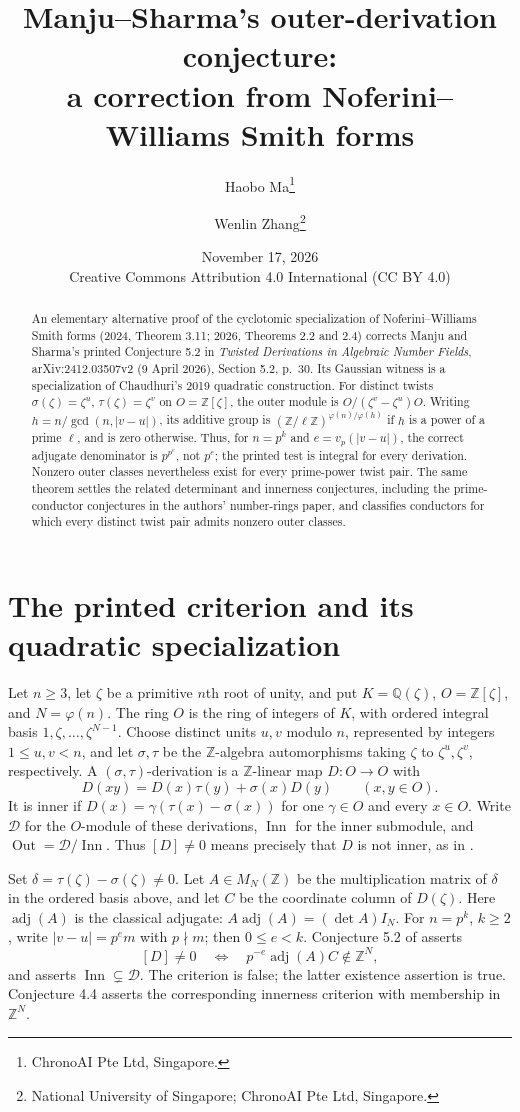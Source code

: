 \documentclass[11pt]{article}
\title{Manju--Sharma's outer-derivation conjecture:\\
a correction from Noferini--Williams Smith forms}
\author{Haobo Ma\thanks{ChronoAI Pte Ltd, Singapore.}
\and Wenlin Zhang\thanks{National University of Singapore; ChronoAI Pte Ltd, Singapore.}}
\date{November 17, 2026\\[3pt]
\small Creative Commons Attribution 4.0 International (CC BY 4.0)}
\newcommand{\ZZ}{\mathbb Z}
\newcommand{\QQ}{\mathbb Q}
\newcommand{\Der}{\mathcal D}
\newcommand{\Inn}{\operatorname{Inn}}
\newcommand{\Out}{\operatorname{Out}}
\newcommand{\adj}{\operatorname{adj}}
\begin{document}
\maketitle
\begin{abstract}
An elementary alternative proof of the cyclotomic specialization of
Noferini--Williams Smith forms (2024, Theorem 3.11; 2026, Theorems 2.2
and 2.4) \cite{NW24,NW26} corrects Manju and Sharma's printed
Conjecture 5.2 in \emph{Twisted Derivations in Algebraic Number Fields},
arXiv:2412.03507v2 (9 April 2026), Section 5.2, p.~30.
Its Gaussian witness is a specialization of Chaudhuri's 2019 quadratic
construction.
For distinct twists $\sigma(\zeta)=\zeta^u$, $\tau(\zeta)=\zeta^v$ on
$O=\ZZ[\zeta]$, the outer module is $O/(\zeta^v-\zeta^u)O$.
Writing $h=n/\gcd(n,|v-u|)$, its additive group is
$(\ZZ/\ell\ZZ)^{\varphi(n)/\varphi(h)}$ if $h$ is a power of a prime
$\ell$, and is zero otherwise. Thus, for $n=p^k$ and
$e=v_p(|v-u|)$, the correct adjugate denominator is $p^{p^e}$,
not $p^e$; the printed test is integral for every derivation.
Nonzero outer classes nevertheless exist for every prime-power twist
pair. The same theorem settles the related determinant and innerness
conjectures, including the prime-conductor conjectures in the authors'
number-rings paper, and classifies conductors for which every distinct
twist pair admits nonzero outer classes.
\end{abstract}

\section{The printed criterion and its quadratic specialization}
Let $n\geq3$, let $\zeta$ be a primitive $n$th root of unity, and put
$K=\QQ(\zeta)$, $O=\ZZ[\zeta]$, and $N=\varphi(n)$.
The ring $O$ is the ring of integers of $K$, with ordered integral basis
$1,\zeta,\ldots,\zeta^{N-1}$.
Choose distinct units $u,v$ modulo $n$, represented by integers
$1\leq u,v<n$, and let $\sigma,\tau$ be the $\ZZ$-algebra
automorphisms taking $\zeta$ to $\zeta^u,\zeta^v$, respectively.
A $(\sigma,\tau)$-derivation is a $\ZZ$-linear map $D:O\to O$ with
\[
 D(xy)=D(x)\tau(y)+\sigma(x)D(y)\qquad(x,y\in O).
\]
It is inner if $D(x)=\gamma(\tau(x)-\sigma(x))$ for one $\gamma\in O$
and every $x\in O$. Write $\Der$ for the $O$-module of these
derivations, $\Inn$ for the inner submodule, and $\Out=\Der/\Inn$.
Thus $[D]\neq0$ means precisely that $D$ is not inner, as in
\cite[Definition 2.1 and Remark 2.6, pp.~3--4]{MS}.

Set $\delta=\tau(\zeta)-\sigma(\zeta)\neq0$. Let $A\in M_N(\ZZ)$
be the multiplication matrix of $\delta$ in the ordered basis above,
and let $C$ be the coordinate column of $D(\zeta)$.
Here $\adj(A)$ is the classical adjugate: $A\adj(A)=(\det A)I_N$.
For $n=p^k$, $k\geq2$, write $|v-u|=p^e m$ with $p\nmid m$;
then $0\leq e<k$. Conjecture 5.2 of \cite{MS} asserts
\begin{equation}\label{eq:printed}
 [D]\neq0\quad\Longleftrightarrow\quad p^{-e}\adj(A)C\notin\ZZ^N,
\end{equation}
and asserts $\Inn\subsetneq\Der$. The criterion is false; the latter
existence assertion is true. Conjecture 4.4 asserts the corresponding
innerness criterion with membership in $\ZZ^N$.
\end{document}
